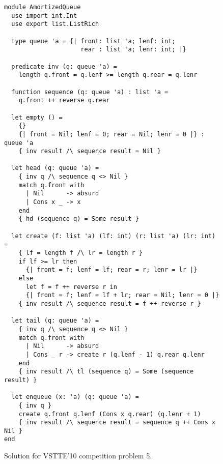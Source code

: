 \begin{figure}
  \centering
\begin{verbatim}
module AmortizedQueue
  use import int.Int
  use export list.ListRich

  type queue 'a = {| front: list 'a; lenf: int;
                     rear : list 'a; lenr: int; |}

  predicate inv (q: queue 'a) =
    length q.front = q.lenf >= length q.rear = q.lenr

  function sequence (q: queue 'a) : list 'a =
    q.front ++ reverse q.rear

  let empty () =
    {}
    {| front = Nil; lenf = 0; rear = Nil; lenr = 0 |} : queue 'a
    { inv result /\ sequence result = Nil }

  let head (q: queue 'a) =
    { inv q /\ sequence q <> Nil }
    match q.front with
      | Nil      -> absurd
      | Cons x _ -> x
    end
    { hd (sequence q) = Some result }

  let create (f: list 'a) (lf: int) (r: list 'a) (lr: int) =
    { lf = length f /\ lr = length r }
    if lf >= lr then
      {| front = f; lenf = lf; rear = r; lenr = lr |}
    else
      let f = f ++ reverse r in
      {| front = f; lenf = lf + lr; rear = Nil; lenr = 0 |}
    { inv result /\ sequence result = f ++ reverse r }

  let tail (q: queue 'a) =
    { inv q /\ sequence q <> Nil }
    match q.front with
      | Nil      -> absurd
      | Cons _ r -> create r (q.lenf - 1) q.rear q.lenr
    end
    { inv result /\ tl (sequence q) = Some (sequence result) }

  let enqueue (x: 'a) (q: queue 'a) =
    { inv q }
    create q.front q.lenf (Cons x q.rear) (q.lenr + 1)
    { inv result /\ sequence result = sequence q ++ Cons x Nil }
end
\end{verbatim}
\vspace*{-2em}\hrulefill
  \caption{Solution for VSTTE'10 competition problem 5.}
  \label{fig:AQueue}
\end{figure}



